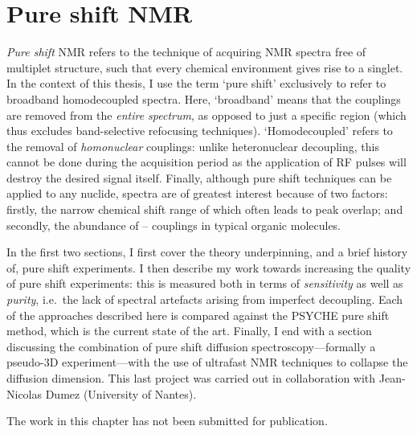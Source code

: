 \chapter{Pure shift NMR}
\label{chpt:pureshift}

\textit{Pure shift} NMR refers to the technique of acquiring NMR spectra free of multiplet structure, such that every chemical environment gives rise to a singlet.\autocite{Zangger2015PNMRS,Castanar2017MRC}
In the context of this thesis, I use the term `pure shift' exclusively to refer to broadband homodecoupled \proton{} spectra.
Here, `broadband' means that the couplings are removed from the \textit{entire spectrum}, as opposed to just a specific region (which thus excludes band-selective refocusing techniques).
`Homodecoupled' refers to the removal of \textit{homonuclear} couplings: unlike heteronuclear decoupling, this cannot be done during the acquisition period as the application of RF pulses will destroy the desired signal itself.
Finally, although pure shift techniques can be applied to any nuclide, \proton{} spectra are of greatest interest because of two factors: firstly, the narrow chemical shift range of \proton{} which often leads to peak overlap; and secondly, the abundance of \proton{}--\proton{} couplings in typical organic molecules.

In the first two sections, I first cover the theory underpinning, and a brief history of, pure shift experiments.
I then describe my work towards increasing the quality of pure shift experiments: this is measured both in terms of \textit{sensitivity} as well as \textit{purity}, i.e.\ the lack of spectral artefacts arising from imperfect decoupling.
Each of the approaches described here is compared against the PSYCHE pure shift method, which is the current state of the art.
Finally, I end with a section discussing the combination of pure shift diffusion spectroscopy---formally a pseudo-3D experiment---with the use of ultrafast NMR techniques to collapse the diffusion dimension.
This last project was carried out in collaboration with Jean-Nicolas Dumez (University of Nantes).

The work in this chapter has not been submitted for publication.

\clearpage









\printbibliography[heading=subbibnumbered]{}

